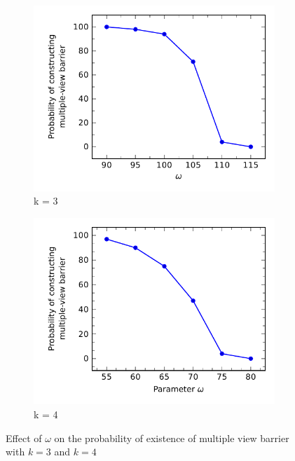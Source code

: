 %
\begin{figure}[!h]
	\begin{subfigure}[t]{.5\textwidth}
		\centering
		\includegraphics[scale=.8]{Hinhanh/OmegaEffect/probability/k3.pdf}		
		\caption{k = 3}
	\end{subfigure}
	\begin{subfigure}[t]{.5\textwidth}
		\centering
		\includegraphics[scale=.8]{Hinhanh/OmegaEffect/probability/k4.pdf}		
		\caption{k = 4}
	\end{subfigure}
\caption{Effect of $\omega$ on the probability of existence of multiple view barrier with $k = 3$ and $k = 4$}
\label{fig:wp}
\end{figure}


